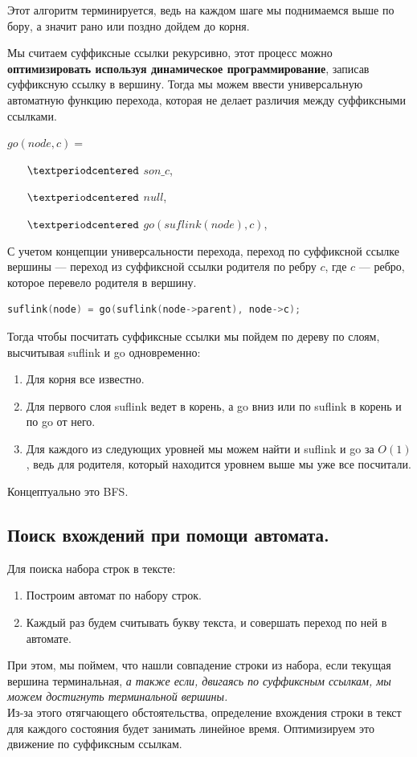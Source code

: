 Этот алгоритм терминируется, ведь на каждом шаге мы поднимаемся выше по бору, а значит рано или поздно дойдем до корня.

Мы считаем суффиксные ссылки рекурсивно, этот процесс можно \textbf{оптимизировать используя динамическое программирование}, записав суффиксную ссылку в вершину. 
Тогда мы можем ввести универсальную автоматную функцию перехода, которая не делает различия между суффиксными ссылками.

$go(node, c) = $
\begin{itemize}
    \item[$\textperiodcentered$] $son\_c$, 
    \item[$\textperiodcentered$] $null$, 
    \item[$\textperiodcentered$] $go(suflink(node), c)$, 
\end{itemize}

С учетом концепции универсальности перехода, переход по суффиксной ссылке вершины --- переход из суффиксной ссылки родителя по ребру $c$, где  $c$ --- ребро, которое перевело родителя в вершину.
\begin{lstlisting}[language = C++]
    suflink(node) = go(suflink(node->parent), node->c); 
\end{lstlisting}

Тогда чтобы посчитать суффиксные ссылки мы пойдем по дереву по слоям, высчитывая suflink и go одновременно:
\begin{enumerate}
    \item Для корня все известно.
    \item Для первого слоя suflink ведет в корень, а go вниз или по suflink в корень и по go от него.
    \item Для каждого из следующих уровней мы можем найти и suflink и go за $O(1)$, ведь для родителя, который находится уровнем выше мы уже все посчитали.
\end{enumerate}
Концептуально это BFS.

\subsection{Поиск вхождений при помощи автомата.}
Для поиска набора строк в тексте:
\begin{enumerate}
    \item Построим автомат по набору строк. 
    \item Каждый раз будем считывать букву текста, и совершать переход по ней в автомате.
\end{enumerate}
При этом, мы поймем, что нашли совпадение строки из набора, если текущая вершина терминальная, \textit{а также если, двигаясь по суффиксным ссылкам, мы можем достигнуть терминальной вершины.} \\
Из-за этого отягчающего обстоятельства, определение вхождения строки в текст для каждого состояния будет занимать линейное время.
Оптимизируем это движение по суффиксным ссылкам.


